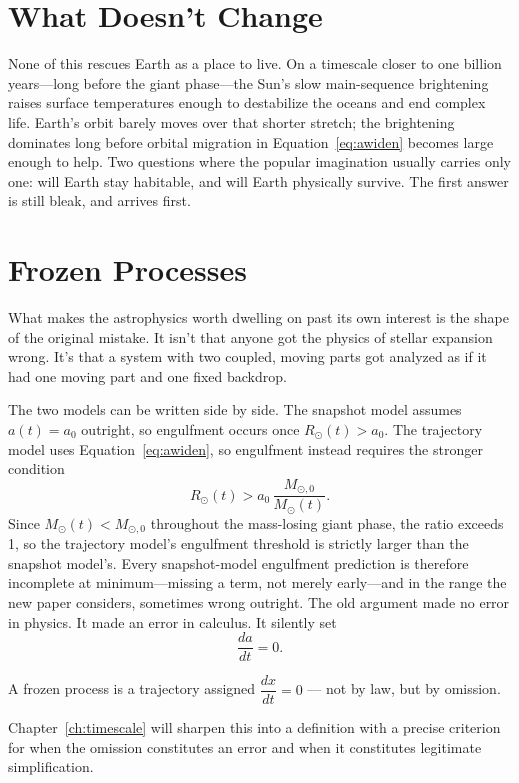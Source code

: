 \documentclass[11pt]{book}
\theoremstyle{plain}
\theoremstyle{definition}
\theoremstyle{remark}
\begin{document}
\section{What Doesn't Change}

None of this rescues Earth as a place to live. On a timescale closer to one billion years---long before the giant phase---the Sun's slow main-sequence brightening raises surface temperatures enough to destabilize the oceans and end complex life. Earth's orbit barely moves over that shorter stretch; the brightening dominates long before orbital migration in Equation~\eqref{eq:awiden} becomes large enough to help. Two questions where the popular imagination usually carries only one: will Earth stay habitable, and will Earth physically survive. The first answer is still bleak, and arrives first.

\section{Frozen Processes}

What makes the astrophysics worth dwelling on past its own interest is the shape of the original mistake. It isn't that anyone got the physics of stellar expansion wrong. It's that a system with two coupled, moving parts got analyzed as if it had one moving part and one fixed backdrop.

The two models can be written side by side. The snapshot model assumes $a(t) = a_0$ outright, so engulfment occurs once $R_\odot(t) > a_0$. The trajectory model uses Equation~\eqref{eq:awiden}, so engulfment instead requires the stronger condition
\[
R_\odot(t) > a_0\,\frac{M_{\odot,0}}{M_\odot(t)}.
\]
Since $M_\odot(t) < M_{\odot,0}$ throughout the mass-losing giant phase, the ratio exceeds 1, so the trajectory model's engulfment threshold is strictly larger than the snapshot model's. Every snapshot-model engulfment prediction is therefore incomplete at minimum---missing a term, not merely early---and in the range the new paper considers, sometimes wrong outright. The old argument made no error in physics. It made an error in calculus. It silently set
\[
\frac{da}{dt} = 0.
\]

\begin{tcolorbox}[title={Frozen Process (Preliminary)}]
\centering
A frozen process is a trajectory assigned $\dfrac{dx}{dt}=0$ --- not by law, but by omission.
\end{tcolorbox}

\noindent Chapter~\ref{ch:timescale} will sharpen this into a definition with a precise criterion for when the omission constitutes an error and when it constitutes legitimate simplification.
\end{document}
